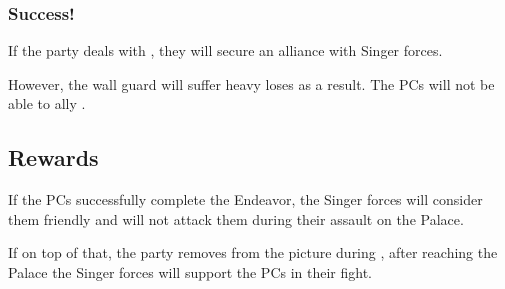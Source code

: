 \subsubsection{Success!}

If the party deals with \npcHighmarshal{}, they will secure an alliance with Singer forces.

However, the wall guard will suffer heavy loses as a result. The PCs will not be able to ally \npcHighmarshal{}.



\subsection{Rewards}

If the PCs successfully complete the Endeavor, the Singer forces will consider them friendly and will not attack them during their assault on the Palace.

If on top of that, the party removes \npcHighmarshal{} from the picture during , after reaching the Palace the Singer forces will support the PCs in their fight.
